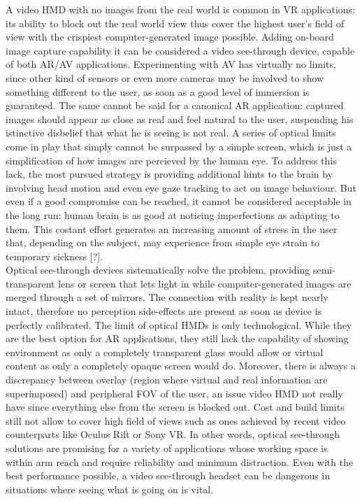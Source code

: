 A video HMD with no images from the real world is common in VR applications: its ability to block out the real world view thus cover the highest user’s field of view with the crispiest computer-generated image possible. Adding on-board image capture capability it can be considered a video see-through device, capable of both AR/AV applications. Experimenting with AV has virtually no limits, since other kind of sensors or even more cameras may be involved to show something different to the user, as soon as a good level of immersion is guaranteed. The same cannot be said for a canonical AR application: captured images should appear as close as real and feel natural to the user, suspending his istinctive disbelief that what he is seeing is not real. A series of optical limits come in play that simply cannot be surpassed by a simple screen, which is just a simplification of how images are percieved by the human eye. To address this lack, the most pursued strategy is providing additional hints to the brain by involving head motion and even eye gaze tracking to act on image behaviour. But even if a good compromise can be reached, it cannot be considered acceptable in the long run: human brain is as good at noticing imperfections as adapting to them. This costant effort generates an increasing amount of stress in the user that, depending on the subject, may experience from simple eye strain to temporary sickness [?].\\
Optical see-through devices sistematically solve the problem, providing semi-transparent lens or screen that lets light in while computer-generated images are merged through a set of mirrors. The connection with reality is kept nearly intact, therefore no perception side-effects are present as soon as device is perfectly calibrated. The limit of optical HMDs is only technological. While they are the best option for AR applications, they still lack the capability of showing environment as only a completely transparent glass would allow or virtual content as only a completely opaque screen would do. Moreover, there is always a discrepancy between overlay (region where virtual and real information are superimposed) and peripheral FOV of the user, an issue video HMD not really have since everything else from the screen is blocked out. Cost and build limits still not allow to cover high field of views such as ones achieved by recent video counterparts like Oculus Rift or Sony VR. In other words, optical see-through solutions are promising for a variety of applications whose working space is within arm reach and require reliability and minimum distraction. Even with the best performance possible, a video see-through headset can be dangerous in situations where seeing what is going on is vital.\\
